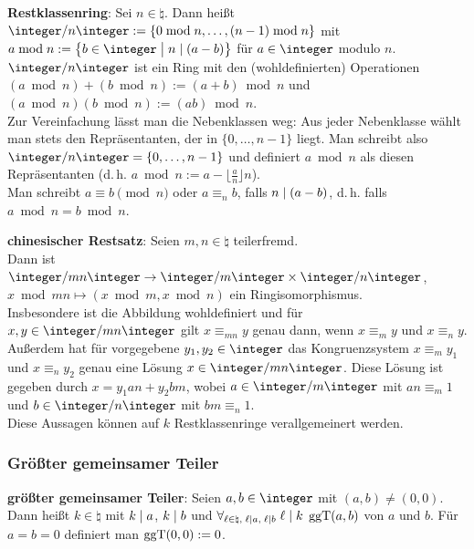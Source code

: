 \textbf{Restklassenring}:
Sei $n \in \natural$.
Dann heißt $\ZnZ := \{0 \bmod n, \dotsc, (n - 1) \bmod n\}$ mit\\
$a \bmod n := \big\{b \in \integer \;\big|\; n \teilt (a - b)\big\}$ für $a \in \integer$
 modulo $n$.\\
$\ZnZ$ ist ein Ring mit den (wohldefinierten) Operationen\\
$(a \bmod n) + (b \bmod n) := (a + b) \bmod n$ und
$(a \bmod n)(b \bmod n) := (ab) \bmod n$.\\
Zur Vereinfachung lässt man die Nebenklassen weg:
Aus jeder Nebenklasse wählt man stets den Repräsentanten, der in $\{0, \dotsc, n - 1\}$ liegt.
Man schreibt also $\ZnZ = \{0, \dotsc, n - 1\}$ und definiert
$a \bmod n$ als diesen Repräsentanten
(d.\,h. $a \bmod n := a - \lfloor\frac{a}{n}\rfloor n$).\\
Man schreibt $a \equiv b \pmod n$ oder $a \equiv_n b$, falls $n \mid (a - b)$,
d.\,h. falls $a \bmod n = b \bmod n$.

\textbf{chinesischer Restsatz}:
Seien $m, n \in \natural$ teilerfremd.\\
Dann ist
$\integer/mn\integer \rightarrow \integer/m\integer \times \integer/n\integer$,
$x \bmod mn \mapsto (x \bmod m, x \bmod n)$
ein Ringisomorphismus.\\
Insbesondere ist die Abbildung wohldefiniert und für $x, y \in \integer/mn\integer$ gilt
$x \equiv_{mn} y$ genau dann, wenn $x \equiv_m y$ und $x \equiv_n y$.\\
Außerdem hat für vorgegebene $y_1, y_2 \in \integer$ das Kongruenzsystem
$x \equiv_m y_1$ und $x \equiv_n y_2$ genau eine Lösung $x \in \integer/mn\integer$.
Diese Lösung ist gegeben durch $x = y_1 a n + y_2 b m$,
wobei $a \in \integer/m\integer$ mit $an \equiv_m 1$ und
$b \in \integer/n\integer$ mit $bm \equiv_n 1$.\\
Diese Aussagen können auf $k$ Restklassenringe verallgemeinert werden.

\subsubsection{%
    Größter gemeinsamer Teiler%
}

\textbf{größter gemeinsamer Teiler}:
Seien $a, b \in \integer$ mit $(a, b) \not= (0, 0)$.\\
Dann heißt $k \in \natural$ mit $k \mid a$, $k \mid b$ und
$\forall_{\ell \in \natural,\; \ell \mid a,\; \ell \mid b}\; \ell \mid k$
 $\operatorname{ggT}(a, b)$ von $a$ und $b$.
Für $a = b = 0$ definiert man $\operatorname{ggT}(0, 0) := 0$.

